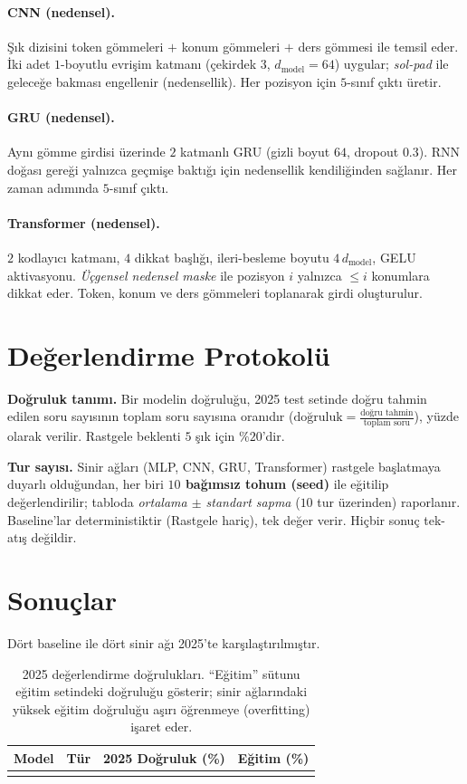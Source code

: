 \documentclass[11pt]{article}
\begin{document}
\paragraph{CNN (nedensel).} Şık dizisini token gömmeleri $+$ konum gömmeleri
$+$ ders gömmesi ile temsil eder. İki adet $1$-boyutlu evrişim katmanı
(çekirdek $3$, $d_{\text{model}}=64$) uygular; \emph{sol-pad} ile geleceğe
bakması engellenir (nedensellik). Her pozisyon için $5$-sınıf çıktı üretir.

\paragraph{GRU (nedensel).} Aynı gömme girdisi üzerinde $2$ katmanlı GRU
(gizli boyut $64$, dropout $0.3$). RNN doğası gereği yalnızca geçmişe baktığı
için nedensellik kendiliğinden sağlanır. Her zaman adımında $5$-sınıf çıktı.

\paragraph{Transformer (nedensel).} $2$ kodlayıcı katmanı, $4$ dikkat başlığı,
ileri-besleme boyutu $4\,d_{\text{model}}$, GELU aktivasyonu. \emph{Üçgensel
nedensel maske} ile pozisyon $i$ yalnızca $\le i$ konumlara dikkat eder.
Token, konum ve ders gömmeleri toplanarak girdi oluşturulur.

\section{Değerlendirme Protokolü}
\textbf{Doğruluk tanımı.} Bir modelin doğruluğu, 2025 test setinde doğru
tahmin edilen soru sayısının toplam soru sayısına oranıdır
($\text{doğruluk}=\tfrac{\text{doğru tahmin}}{\text{toplam soru}}$), yüzde
olarak verilir. Rastgele beklenti $5$ şık için $\%20$'dir.

\textbf{Tur sayısı.} Sinir ağları (MLP, CNN, GRU, Transformer) rastgele
başlatmaya duyarlı olduğundan, her biri \textbf{$10$ bağımsız tohum (seed)}
ile eğitilip değerlendirilir; tabloda \emph{ortalama $\pm$ standart sapma}
($10$ tur üzerinden) raporlanır. Baseline'lar deterministiktir (Rastgele
hariç), tek değer verir. Hiçbir sonuç tek-atış değildir.

\section{Sonuçlar}
Dört baseline ile dört sinir ağı 2025'te karşılaştırılmıştır.

\begin{table}[H]
\centering
\caption{2025 değerlendirme doğrulukları. ``Eğitim'' sütunu eğitim setindeki
doğruluğu gösterir; sinir ağlarındaki yüksek eğitim doğruluğu aşırı öğrenmeye
(overfitting) işaret eder.}
\label{tab:results}
\begin{tabular}{llcc}
\toprule
Model & Tür & 2025 Doğruluk (\%) & Eğitim (\%) \\
\midrule

\\
\bottomrule
\end{tabular}
\end{table}
\end{document}
